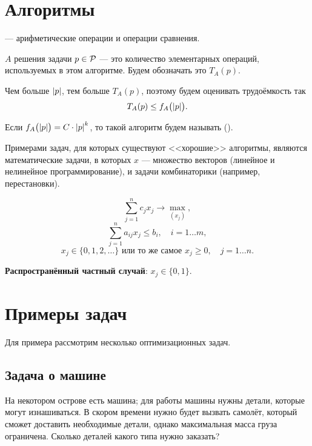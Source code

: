 \section{Алгоритмы}


 --- арифметические операции и операции сравнения.


 $A$ решения задачи $p \in \P$ --- это количество элементарных операций, используемых в этом алгоритме. Будем обозначать это $T_A(p)$.

\remark

Чем больше $\abs{p}$, тем больше $T_A(p)$, поэтому будем оценивать трудоёмкость так
\[T_A(p) \le f_A\big(\abs{p}\big).\]


Если $f_A\big(\abs{p}\big) = C \cdot \abs{p}^k$, то такой алгоритм будем называть  ().

Примерами задач, для которых существуют <<хорошие>> алгоритмы, являются математические задачи, в которых $x$ --- множество векторов (линейное и нелинейное программирование), и задачи комбинаторики (например, перестановки).


\[\sum_{j=1}^{n} c_j x_j \to \max_{(x_j)},\]
\[\sum_{j=1}^{n}a_{ij} x_j \le b_i, \quad i = 1\dots m,\]
\[x_j \in \{0, 1, 2, \dots\} \text{ или то же самое } x_j \ge 0, \quad j = 1\dots n.\]

\textbf{Распространённый частный случай}: $x_j \in \{0, 1\}$.

\section{Примеры задач}

Для примера рассмотрим несколько оптимизационных задач.

\subsection{Задача о машине}\label{pr:car_on_island}

На некотором острове есть машина; для работы машины нужны детали, которые могут изнашиваться. В скором времени нужно будет вызвать самолёт, который сможет доставить необходимые детали, однако максимальная масса груза ограничена. Сколько деталей какого типа нужно заказать?

